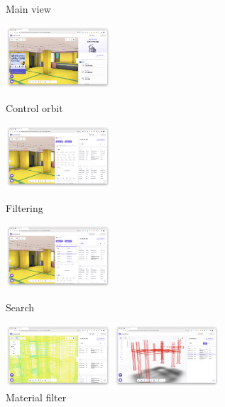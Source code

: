 \begin{itemize}
\begin{itemize}[label=$\star$]
\begin{figure}[!ht]
\begin{fullwidth}
{					            \caption*{Main view}
				            }\qquad
				            \parbox{0.35\textwidth}{
					            \centering
					            \includegraphics[width=0.35\textwidth]{images/builderhub-curation-control.png}
					            \caption*{Control orbit}
				            }
				            \parbox{0.35\textwidth}{
					            \centering
					            \includegraphics[width=0.35\textwidth]{images/builderhub-curation-filter.png}
					            \caption*{Filtering}
				            }\qquad
				            \parbox{0.35\textwidth}{
					            \centering
					            \includegraphics[width=0.35\textwidth]{images/builderhub-curation-filter-search.png}
					            \caption*{Search}
				            }\qquad
				            \parbox{0.35\textwidth}{
					            \centering
					            \includegraphics[width=0.35\textwidth]{images/builderhub-curation-filter-material.png}
					            \caption*{Material filter}
				            }\qquad
				            \parbox{0.35\textwidth}{
					            \centering
					            \includegraphics[width=0.35\textwidth]{images/builderhub-curation-filter-table.png}
}
\end{fullwidth}
\end{figure}
\end{itemize}
\end{itemize}
